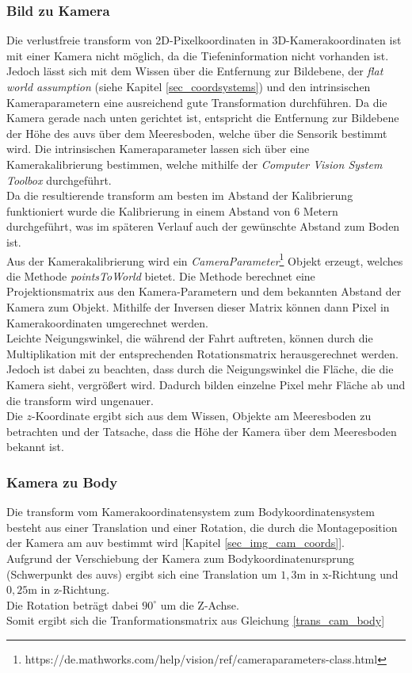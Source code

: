 \subsubsection{Bild zu Kamera}
\label{section_PicToCam}
Die verlustfreie \gls{transform} von 2D-Pixelkoordinaten in 3D-Kamerakoordinaten ist mit einer Kamera nicht möglich, da die Tiefeninformation nicht vorhanden ist. Jedoch lässt sich mit dem Wissen über die Entfernung zur Bildebene, der \textit{flat world assumption} (siehe Kapitel \ref{sec_coordsystems}) und den intrinsischen Kameraparametern eine ausreichend gute Transformation durchführen. Da die Kamera gerade nach unten gerichtet ist, entspricht die Entfernung zur Bildebene der Höhe des \gls{auv}s über dem Meeresboden, welche über die Sensorik bestimmt wird. Die intrinsischen Kameraparameter lassen sich über eine Kamerakalibrierung bestimmen, welche mithilfe der \matlab \textit{Computer Vision System Toolbox} durchgeführt.\\
Da die resultierende \gls{transform} am besten im Abstand der Kalibrierung funktioniert wurde die Kalibrierung in einem Abstand von 6 Metern durchgeführt, was im späteren Verlauf auch der gewünschte Abstand zum Boden ist.\\
Aus der Kamerakalibrierung wird ein \textit{CameraParameter}\footnote{https://de.mathworks.com/help/vision/ref/cameraparameters-class.html} Objekt erzeugt, welches die Methode \textit{pointsToWorld} bietet. Die Methode berechnet eine Projektionsmatrix aus den Kamera-Parametern und dem bekannten Abstand der Kamera zum Objekt. Mithilfe der Inversen dieser Matrix können dann Pixel in Kamerakoordinaten umgerechnet werden.\\
Leichte Neigungswinkel, die während der Fahrt auftreten, können durch die Multiplikation mit der entsprechenden Rotationsmatrix herausgerechnet werden. Jedoch ist dabei zu beachten, dass durch die Neigungswinkel die Fläche, die die Kamera sieht, vergrößert wird. Dadurch bilden einzelne Pixel mehr Fläche ab und die \gls{transform} wird ungenauer.\\
Die $z$-Koordinate ergibt sich aus dem Wissen, Objekte am Meeresboden zu betrachten und der Tatsache, dass die Höhe der Kamera über dem Meeresboden bekannt ist.

\subsubsection{Kamera zu Body}
Die \gls{transform} vom Kamerakoordinatensystem zum Bodykoordinatensystem besteht aus einer Translation und einer Rotation, die durch die Montageposition der Kamera am \gls{auv} bestimmt wird [Kapitel \ref{sec_img_cam_coords}].\\
Aufgrund der Verschiebung der Kamera zum Bodykoordinatenursprung (Schwerpunkt des \gls{auv}s) ergibt sich eine Translation um $1,3$m in x-Richtung und $0,25$m in z-Richtung.\\
Die Rotation beträgt dabei $90^\circ$ um die Z-Achse.\\
Somit ergibt sich die Tranformationsmatrix aus Gleichung \ref{trans_cam_body}\\

